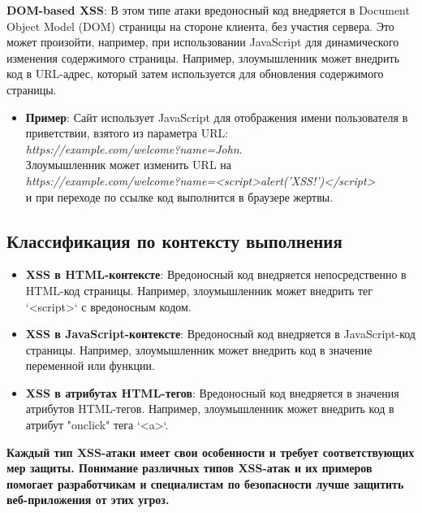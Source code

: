 \documentclass[a4paper,12pt]{diplom}
\begin{document}
	 \textbf{DOM-based XSS}:  В этом типе атаки вредоносный код внедряется в Document Object Model (DOM) страницы на стороне клиента,  без участия сервера.  Это может произойти,  например,  при использовании JavaScript для динамического изменения содержимого страницы.  Например,  злоумышленник может внедрить код в URL-адрес,  который затем используется для обновления содержимого страницы. 
	 
	 \begin{itemize}
	 	\item \textbf{Пример}:  Сайт использует JavaScript для отображения имени пользователя в приветствии,  взятого из параметра URL: \\ \textit{https://example.com/welcome?name=John}.\\ Злоумышленник может изменить URL на\\ 
	 	\textit{https://example.com/welcome?name=<script>alert('XSS!')</script>} \\
	 	 и при переходе по ссылке код выполнится в браузере жертвы. 
	 \end{itemize}
	 
	 \subsection{Классификация по контексту выполнения}
	 
	 \begin{itemize}
	 	\item \textbf{XSS в HTML-контексте}:  Вредоносный код внедряется непосредственно в HTML-код страницы.  Например,  злоумышленник может внедрить тег `<script>` с вредоносным кодом. 
	 	\item \textbf{XSS в JavaScript-контексте}:  Вредоносный код внедряется в JavaScript-код страницы.  Например,  злоумышленник может внедрить код в значение переменной или функции. 
	 	\item \textbf{XSS в атрибутах HTML-тегов}:  Вредоносный код внедряется в значения атрибутов HTML-тегов.  Например,  злоумышленник может внедрить код в атрибут "onclick"  тега `<a>`. 
	\end{itemize}
	
	 \textbf{Каждый тип XSS-атаки имеет свои особенности и требует соответствующих мер защиты.  Понимание различных типов XSS-атак и их примеров помогает разработчикам и специалистам по безопасности лучше защитить веб-приложения от этих угроз.}
	 
	 
	 
	 
	 
\end{document}
